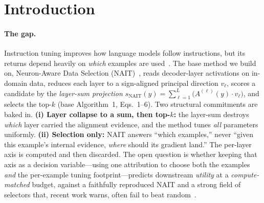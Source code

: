 \documentclass[11pt]{article}
\theoremstyle{definition}
\begin{document}
\section{Introduction}
\label{sec:intro}

\paragraph{The gap.}
Instruction tuning improves how language models follow instructions, but its returns
depend heavily on \emph{which} examples are used~\cite{zhou2023lima,cao2023instruction}.
The base method we build on, Neuron-Aware Data Selection (NAIT)~\cite{nait2026}, reads
decoder-layer activations on in-domain data, reduces each layer to a sign-aligned
principal direction $v_\ell$, scores a candidate by the \emph{layer-sum projection}
$s_{\mathrm{NAIT}}(y)=\sum_{\ell=1}^{L}\big(A^{(\ell)}(y)\cdot v_\ell\big)$, and selects
the top-$k$ (base Algorithm~1, Eqs.~1--6). Two structural commitments are baked in.
\textbf{(i) Layer collapse to a sum, then top-$k$:} the layer-sum destroys \emph{which}
layer carried the alignment evidence, and the method tunes \emph{all} parameters
uniformly. \textbf{(ii) Selection only:} NAIT answers ``which examples,'' never ``given
this example's internal evidence, \emph{where} should its gradient land.'' The
per-layer axis is computed and then discarded. The open question is whether keeping
that axis as a decision variable---using one attribution to choose both the examples
\emph{and} the per-example tuning footprint---predicts downstream \emph{utility} at a
\emph{compute-matched} budget, against a faithfully reproduced NAIT and a strong field
of selectors that, recent work warns, often fail to beat random~\cite{diddee2024chasing}.
\end{document}
